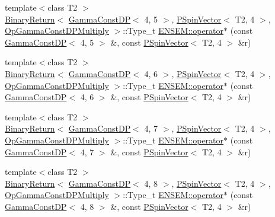 \begin{DoxyCompactItemize}
\item 
{\footnotesize template$<$class T2 $>$ }\\\mbox{\hyperlink{structENSEM_1_1BinaryReturn}{Binary\+Return}}$<$ \mbox{\hyperlink{classENSEM_1_1GammaConstDP}{Gamma\+Const\+DP}}$<$ 4, 5 $>$, \mbox{\hyperlink{classENSEM_1_1PSpinVector}{P\+Spin\+Vector}}$<$ T2, 4 $>$, \mbox{\hyperlink{structENSEM_1_1OpGammaConstDPMultiply}{Op\+Gamma\+Const\+D\+P\+Multiply}} $>$\+::Type\+\_\+t \mbox{\hyperlink{group__primspinvector_gaedbd65630192bc0f45ecad29cfa08152}{E\+N\+S\+E\+M\+::operator$\ast$}} (const \mbox{\hyperlink{classENSEM_1_1GammaConstDP}{Gamma\+Const\+DP}}$<$ 4, 5 $>$ \&, const \mbox{\hyperlink{classENSEM_1_1PSpinVector}{P\+Spin\+Vector}}$<$ T2, 4 $>$ \&r)
\item 
{\footnotesize template$<$class T2 $>$ }\\\mbox{\hyperlink{structENSEM_1_1BinaryReturn}{Binary\+Return}}$<$ \mbox{\hyperlink{classENSEM_1_1GammaConstDP}{Gamma\+Const\+DP}}$<$ 4, 6 $>$, \mbox{\hyperlink{classENSEM_1_1PSpinVector}{P\+Spin\+Vector}}$<$ T2, 4 $>$, \mbox{\hyperlink{structENSEM_1_1OpGammaConstDPMultiply}{Op\+Gamma\+Const\+D\+P\+Multiply}} $>$\+::Type\+\_\+t \mbox{\hyperlink{group__primspinvector_ga118f057eadddaebf7485ca26d25ad24f}{E\+N\+S\+E\+M\+::operator$\ast$}} (const \mbox{\hyperlink{classENSEM_1_1GammaConstDP}{Gamma\+Const\+DP}}$<$ 4, 6 $>$ \&, const \mbox{\hyperlink{classENSEM_1_1PSpinVector}{P\+Spin\+Vector}}$<$ T2, 4 $>$ \&r)
\item 
{\footnotesize template$<$class T2 $>$ }\\\mbox{\hyperlink{structENSEM_1_1BinaryReturn}{Binary\+Return}}$<$ \mbox{\hyperlink{classENSEM_1_1GammaConstDP}{Gamma\+Const\+DP}}$<$ 4, 7 $>$, \mbox{\hyperlink{classENSEM_1_1PSpinVector}{P\+Spin\+Vector}}$<$ T2, 4 $>$, \mbox{\hyperlink{structENSEM_1_1OpGammaConstDPMultiply}{Op\+Gamma\+Const\+D\+P\+Multiply}} $>$\+::Type\+\_\+t \mbox{\hyperlink{group__primspinvector_ga06f03963e659581745493e56edf21491}{E\+N\+S\+E\+M\+::operator$\ast$}} (const \mbox{\hyperlink{classENSEM_1_1GammaConstDP}{Gamma\+Const\+DP}}$<$ 4, 7 $>$ \&, const \mbox{\hyperlink{classENSEM_1_1PSpinVector}{P\+Spin\+Vector}}$<$ T2, 4 $>$ \&r)
\item 
{\footnotesize template$<$class T2 $>$ }\\\mbox{\hyperlink{structENSEM_1_1BinaryReturn}{Binary\+Return}}$<$ \mbox{\hyperlink{classENSEM_1_1GammaConstDP}{Gamma\+Const\+DP}}$<$ 4, 8 $>$, \mbox{\hyperlink{classENSEM_1_1PSpinVector}{P\+Spin\+Vector}}$<$ T2, 4 $>$, \mbox{\hyperlink{structENSEM_1_1OpGammaConstDPMultiply}{Op\+Gamma\+Const\+D\+P\+Multiply}} $>$\+::Type\+\_\+t \mbox{\hyperlink{group__primspinvector_gaf50876f75a5b7bb882a7346408b4a90c}{E\+N\+S\+E\+M\+::operator$\ast$}} (const \mbox{\hyperlink{classENSEM_1_1GammaConstDP}{Gamma\+Const\+DP}}$<$ 4, 8 $>$ \&, const \mbox{\hyperlink{classENSEM_1_1PSpinVector}{P\+Spin\+Vector}}$<$ T2, 4 $>$ \&r)

\end{DoxyCompactItemize}
